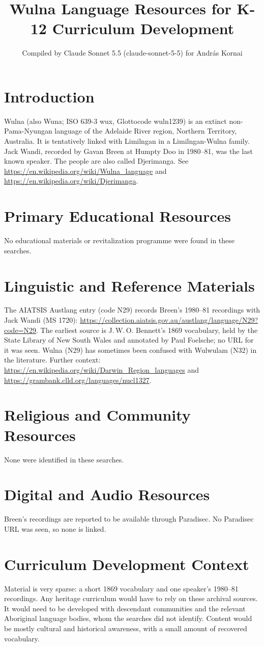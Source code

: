 \documentclass[12pt]{article}
\title{Wulna Language Resources for K-12 Curriculum Development}
\author{Compiled by Claude Sonnet 5.5 (claude-sonnet-5-5) for Andr\'as Kornai}
\date{}
\begin{document}
\maketitle

\section{Introduction}
Wulna (also Wuna; ISO 639-3 wux, Glottocode wuln1239) is an extinct non-Pama-Nyungan language of the Adelaide River region, Northern Territory, Australia. It is tentatively linked with Limilngan in a Limilngan-Wulna family. Jack Wandi, recorded by Gavan Breen at Humpty Doo in 1980--81, was the last known speaker. The people are also called Djerimanga. See \url{https://en.wikipedia.org/wiki/Wulna_language} and \url{https://en.wikipedia.org/wiki/Djerimanga}.

\section{Primary Educational Resources}
No educational materials or revitalization programme were found in these searches.

\section{Linguistic and Reference Materials}
The AIATSIS Austlang entry (code N29) records Breen's 1980--81 recordings with Jack Wandi (MS 1720): \url{https://collection.aiatsis.gov.au/austlang/language/N29?code=N29}. The earliest source is J.\,W.\,O. Bennett's 1869 vocabulary, held by the State Library of New South Wales and annotated by Paul Foelsche; no URL for it was seen. Wulna (N29) has sometimes been confused with Wulwulam (N32) in the literature. Further context: \url{https://en.wikipedia.org/wiki/Darwin_Region_languages} and \url{https://grambank.clld.org/languages/nucl1327}.

\section{Religious and Community Resources}
None were identified in these searches.

\section{Digital and Audio Resources}
Breen's recordings are reported to be available through Paradisec. No Paradisec URL was seen, so none is linked.

\section{Curriculum Development Context}
Material is very sparse: a short 1869 vocabulary and one speaker's 1980--81 recordings. Any heritage curriculum would have to rely on these archival sources. It would need to be developed with descendant communities and the relevant Aboriginal language bodies, whom the searches did not identify. Content would be mostly cultural and historical awareness, with a small amount of recovered vocabulary.
\end{document}
